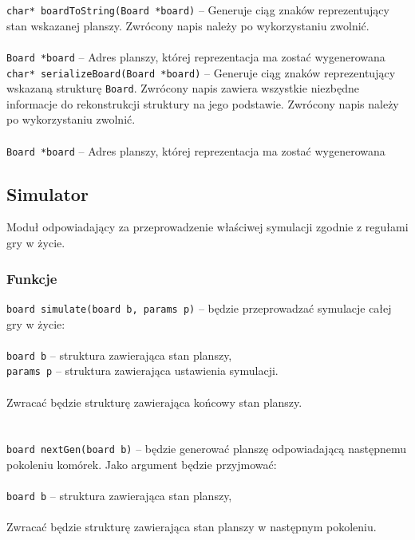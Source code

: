 \documentclass{article}
\begin{document}
\vspace*{8mm}
\noindent{}\texttt{char* boardToString(Board *board)} -- Generuje ciąg znaków reprezentujący stan wskazanej planszy. Zwrócony napis należy po wykorzystaniu zwolnić. \\ \\
\hspace*{10mm}\texttt{Board *board} -- Adres planszy, której reprezentacja ma zostać wygenerowana\\

\vspace*{8mm}
\noindent{}\texttt{char* serializeBoard(Board *board)} -- Generuje ciąg znaków reprezentujący wskazaną strukturę \texttt{Board}. Zwrócony napis zawiera wszystkie niezbędne informacje do rekonstrukcji struktury na jego podstawie. Zwrócony napis należy po wykorzystaniu zwolnić. \\ \\
\hspace*{10mm}\texttt{Board *board} -- Adres planszy, której reprezentacja ma zostać wygenerowana


\subsection{Simulator}
Moduł odpowiadający za przeprowadzenie właściwej symulacji zgodnie z regułami gry w życie.

\subsubsection{Funkcje}
\texttt{board simulate(board b, params p)} -- będzie przeprowadzać symulacje całej gry w życie:\\\\
	 \hspace*{10mm}\texttt{board b} -- struktura zawierająca stan planszy,\\
	 \hspace*{10mm}\texttt{params p} -- struktura zawierająca ustawienia symulacji.\\
\\
Zwracać będzie strukturę zawierająca końcowy stan planszy.\\\\
\\
\texttt{board nextGen(board b)} -- będzie generować planszę odpowiadającą następnemu pokoleniu komórek. Jako argument będzie przyjmować:\\\\
	 \hspace*{10mm}\texttt{board b} -- struktura zawierająca stan planszy,\\
\\
Zwracać będzie strukturę zawierająca stan planszy w następnym pokoleniu.
\end{document}

